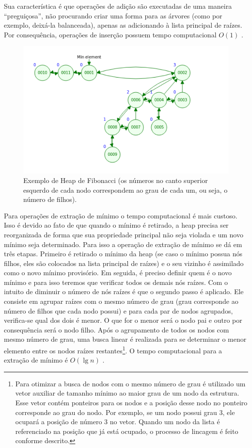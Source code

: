 Sua característica é que operações de adição são executadas de uma maneira ``preguiçosa'', não procurando criar uma forma para as árvores (como por exemplo, deixá-la balanceada), apenas as adicionando à lista principal de raízes. Por consequência, operações de inserção possuem tempo computacional $O(1)$ \cite{cormen2009introduction}.

\begin{figure}[H]
\centering
\includegraphics[width=.54\textwidth]{figuras/fibonacci-heap1} 
\caption{Exemplo de Heap de Fibonacci (os números no canto superior esquerdo de cada nodo correspondem ao grau de cada um, ou seja, o número de filhos).}
\label{fig-dijkstra-heapfibonacci1}
\end{figure}

Para operações de extração de mínimo o tempo computacional é mais custoso. Isso é devido ao fato de que quando o mínimo é retirado, a heap precisa ser reorganizada de forma que sua propriedade principal não seja violada e um novo mínimo seja determinado. Para isso a operação de extração de mínimo se dá em três etapas. Primeiro é retirado o mínimo da heap (se caso o mínimo possua nós filhos, eles são colocados na lista principal de raízes) e o seu vizinho é assimilado como o novo mínimo provisório. Em seguida, é preciso definir quem é o novo mínimo e para isso teremos que verificar todos os demais nós raízes. Com o intuito de diminuir o número de nós raízes é que o segundo passo é aplicado.  Ele consiste em agrupar raízes com o mesmo número de grau (grau corresponde ao número de filhos que cada nodo possui) e para cada par de nodos agrupados, verifica-se qual dos dois é menor. O que for o menor será o nodo pai e outro por consequência será o nodo filho. Após o agrupamento de todos os nodos com mesmo número de grau, uma busca linear é realizada para se determinar o menor elemento entre os nodos raízes restantes\footnote{Para otimizar a busca de nodos com o mesmo número de grau é utilizado um vetor auxiliar de tamanho mínimo ao maior grau de um nodo da estrutura. Esse vetor contém ponteiros para os nodos e a posição desse nodo no ponteiro corresponde ao grau do nodo. Por exemplo, se um nodo possui grau 3, ele ocupará a posição de número 3 no vetor. Quando um nodo da lista é referenciado na posição que já está ocupado, o processo de lincagem é feito conforme descrito.}. O tempo computacional para a extração de mínimo é $O(\lg n)$ \cite{cormen2009introduction}.

